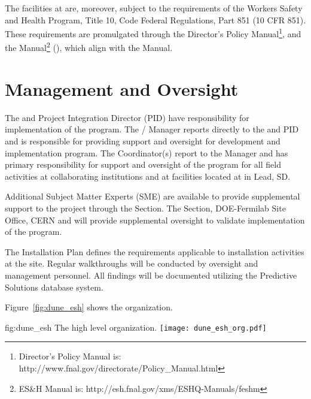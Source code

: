 The \fnal facilities at \surf are, moreover, subject to the requirements of the
 Workers Safety and Health Program, Title 10, Code Federal
Regulations, Part 851 (10 CFR 851). These requirements are
promulgated through the \fnal Director's Policy Manual\footnote{\fnal
  Director's Policy Manual is:
  http://www.fnal.gov/directorate/Policy\_Manual.html}, and the \fnal
{} Manual\footnote{\fnal ES\&H Manual is:
  http://esh.fnal.gov/xms/ESHQ-Manuals/feshm} (), which align with
the \surf {} Manual.


\section{  Management and Oversight}

The  and Project Integration Director
(PID) have responsibility for implementation of the 
 program.  The /  Manager
reports directly to the  and PID and is responsible for
providing  support and oversight for development and implementation
  program. The   Coordinator(s) report to the  
Manager and has primary responsibility for  support and oversight
of the   program for all field activities at collaborating
institutions and at  facilities located at \surf in Lead, SD.

Additional  Subject Matter Experts (SME) are available to provide
supplemental support to the project through the \fnal {}
Section. The \fnal {} Section, DOE-Fermilab Site Office, CERN and
\surf will provide supplemental  oversight to validate
implementation of the    program.

The  Installation  Plan 
defines the  requirements applicable to 
installation activities at the \surf site. Regular  walkthroughs
will be conducted by   oversight and management personnel. All
findings will be documented utilizing the \fnal Predictive
Solutions database system.

Figure~\ref{fig:dune_esh} shows the   organization.
\begin{dunefigure}{fig:dune_esh}
  {The high level   organization.}
  \texttt{[image: dune\_esh\_org.pdf]}
\end{dunefigure}




